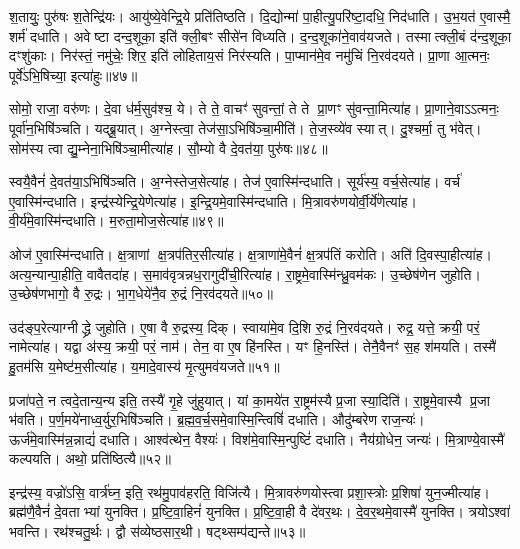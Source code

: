 श॒तायुः॒ पुरु॑षः श॒तेन्द्रि॑यः।
आयु॑ष्ये॒वेन्द्रि॒ये प्रति॑तिष्ठति।
दि॒द्योन्मा॑ पा॒हीत्यु॒परि॑ष्टा॒दधि॒ निद॑धाति।
उ॒भ॒यत॑ ए॒वास्मै॒ शर्म॑ दधाति।
अवेष्टा दन्द॒शूका॒ इति॑ क्ली॒बꣳ सीसे॑न विध्यति।
द॒न्द॒शूका॑ने॒वाव॑यजते।
तस्मात्क्ली॒बं द॑न्द॒शूका॒ दꣳशु॑काः।
निर॑स्तं॒ नमु॑चेः॒ शिर॒ इति॑ लोहिताय॒सं निर॑स्यति।
पा॒प्मान॑मे॒व नमु॑चिं नि॒रव॑दयते।
प्रा॒णा आ॒त्मनः॒ पूर्वे॑\-ऽभि॒षिच्या॒ इत्या॑हुः॥४७॥

सोमो॒ राजा॒ वरु॑णः।
दे॒वा ध॑र्म॒सुव॑श्च॒ ये।
ते ते॒ वाचꣳ॑ सुवन्तां॒ ते ते प्रा॒णꣳ सु॑वन्ता॒मित्या॑ह।
प्रा॒णाने॒वा\-ऽऽत्मनः॒ पूर्वा॑न॒भिषि॑ञ्चति।
यद्ब्रू॒यात्।
अ॒ग्नेस्त्वा॒ तेज॑सा॒\-ऽभिषि॑ञ्चा॒मीति॑।
ते॒ज॒स्व्ये॑व स्यात्।
दु॒श्चर्मा॒ तु भ॑वेत्।
सोम॑स्य त्वा द्यु॒म्नेना॒भिषि॑ञ्चा॒मीत्या॑ह।
सौ॒म्यो वै दे॒वत॑या॒ पुरु॑षः॥४८॥

स्वयै॒वैनं॑ दे॒वत॑या॒\-ऽभिषि॑ञ्चति।
अ॒ग्नेस्तेज॒सेत्या॑ह।
तेज॑ ए॒वास्मि॑न्दधाति।
सूर्य॑स्य॒ वर्च॒सेत्या॑ह।
वर्च॑ ए॒वास्मि॑न्दधाति।
इन्द्र॑स्येन्द्रि॒येणेत्या॑ह।
इ॒न्द्रि॒यमे॒वास्मि॑न्दधाति।
मि॒त्रावरु॑ण\-योर्वी॒र्ये॑णेत्या॑ह।
वी॒र्य॑मे॒वास्मि॑न्दधाति।
म॒रुता॒मोज॒सेत्या॑ह॥४९॥

ओज॑ ए॒वास्मि॑न्दधाति।
क्ष॒त्राणां क्ष॒त्रप॑तिर॒सीत्या॑ह।
क्ष॒त्राणा॑मे॒वैनं॑ क्ष॒त्रप॑तिं करोति।
अति॑ दि॒वस्पा॒हीत्या॑ह।
अत्य॒न्यान्पा॒हीति॒ वावैतदा॑ह।
स॒माव॑वृत्रन्नध॒रागुदी॑ची॒\-रित्या॑ह।
रा॒ष्ट्रमे॒वास्मि॑न्ध्रु॒वम॑कः।
उ॒च्छेष॑णेन जुहोति।
उ॒च्छेष॑णभागो॒ वै रु॒द्रः।
भा॒ग॒धेये॑नै॒व रु॒द्रं नि॒रव॑दयते॥५०॥

उद॑ङ्प॒रेत्याग्नीद्ध्रे जुहोति।
ए॒षा वै रु॒द्रस्य॒ दिक्।
स्वाया॑मे॒व दि॒शि रु॒द्रं नि॒रव॑दयते।
रुद्र॒ यत्ते॒ क्रयी॒ परं॒ नामेत्या॑ह।
यद्वा अ॑स्य॒ क्रयी॒ परं॒ नाम॑।
तेन॒ वा ए॒ष हि॑नस्ति।
यꣳ हि॒नस्ति॑।
तेनै॒वैनꣳ॑ स॒ह श॑मयति।
तस्मै॑ हु॒तम॑सि य॒मेष्ट॑म॒सीत्या॑ह।
य॒मादे॒वास्य॑ मृ॒त्युमव॑यजते॥५१॥

प्रजा॑पते॒ न त्वदे॒तान्य॒न्य इति॒ तस्यै॑ गृ॒हे जु॑हुयात्।
यां का॒मये॑त रा॒ष्ट्रम॑स्यै प्र॒जा स्या॒दिति॑।
रा॒ष्ट्रमे॒वास्यै प्र॒जा भ॑वति।
प॒र्ण॒मये॑नाध्व॒र्युर॒भिषि॑ञ्चति।
ब्र॒ह्म॒व॒र्च॒समे॒वा\-स्मि॒न्त्विषिं॑ दधाति।
औदु॑म्बरेण राज॒न्यः॑।
ऊर्ज॑मे॒वा\-स्मि॑न्न॒न्नाद्यं॑ दधाति।
आश्व॑त्थेन॒ वैश्यः॑।
विश॑मे॒वास्मि॒न्पुष्टिं॑ दधाति।
नैय॑ग्रोधेन॒ जन्यः॑।
मि॒त्राण्ये॒वास्मै॑ कल्पयति।
अथो॒ प्रति॑ष्ठित्यै॥५२॥

इन्द्र॑स्य॒ वज्रो॑ऽसि॒ वार्त्र॑घ्न॒ इति॒ रथ॑मु॒पाव॑हरति॒ विजि॑त्यै।
मि॒त्रावरु॑णयोस्त्वा प्रशा॒स्त्रोः प्र॒शिषा॑ युन॒ज्मीत्या॑ह।
ब्रह्म॑णै॒वैनं॑ दे॒वताभ्यां युनक्ति।
प्र॒ष्टि॒वा॒हिनं॑ युनक्ति।
प्र॒ष्टि॒वा॒ही वै दे॑वर॒थः।
दे॒व॒र॒थमे॒वास्मै॑ युनक्ति।
त्रयो\-ऽश्वा॑ भवन्ति।
रथ॑श्चतु॒र्थः।
द्वौ स॑व्येष्ठसार॒थी।
षट्थ्सम्प॑द्यन्ते॥५३॥


